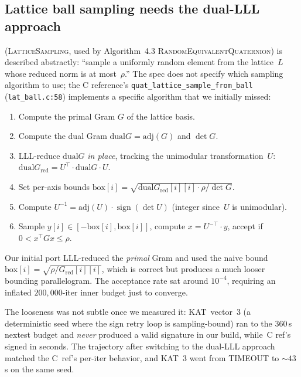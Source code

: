 \subsection{Lattice ball sampling needs the dual-LLL approach}
\label{sec:bug-sample-from-ball-dual-lll}

 (\textsc{LatticeSampling}, used by Algorithm~4.3
\textsc{RandomEquivalentQuaternion}) is described abstractly: ``sample
a uniformly random element from the lattice~$L$ whose reduced norm is
at most~$\rho$.'' The spec does not specify which sampling algorithm
to use; the C reference's
\texttt{quat\_lattice\_sample\_from\_ball} (\texttt{lat\_ball.c:58})
implements a specific algorithm that we initially missed:
\begin{enumerate}[nosep]
  \item Compute the primal Gram $G$ of the lattice basis.
  \item Compute the dual Gram $\mathrm{dual}G = \mathrm{adj}(G)$
        and $\det G$.
  \item LLL-reduce $\mathrm{dual}G$ \emph{in place}, tracking the
        unimodular transformation~$U$:
        $\mathrm{dual}G_{\mathrm{red}} = U^\top \cdot \mathrm{dual}G
        \cdot U$.
  \item Set per-axis bounds
        $\mathrm{box}[i] = \sqrt{\mathrm{dual}G_{\mathrm{red}}[i][i]
        \cdot \rho / \det G}$.
  \item Compute $U^{-1} = \mathrm{adj}(U) \cdot \operatorname{sign}(\det U)$
        (integer since~$U$ is unimodular).
  \item Sample $y[i] \in [-\mathrm{box}[i], \mathrm{box}[i]]$,
        compute $x = U^{-\top} \cdot y$, accept if
        $0 < x^\top G x \le \rho$.
\end{enumerate}
Our initial port LLL-reduced the \emph{primal} Gram and used the
naive bound $\mathrm{box}[i] = \sqrt{\rho / G_{\mathrm{red}}[i][i]}$,
which is correct but produces a much looser bounding parallelogram.
The acceptance rate sat around $10^{-4}$, requiring an inflated
$200{,}000$-iter inner budget just to converge.

The looseness was not subtle once we measured it: KAT~vector~3 (a
deterministic seed where the sign retry loop is sampling-bound) ran
to the 360\,s nextest budget and \emph{never} produced a valid
signature in our build, while~C ref's signed in seconds.  The
trajectory after switching to the dual-LLL approach matched the
C~ref's per-iter behavior, and KAT~3 went from \textsc{TIMEOUT} to
$\sim 43$\,s on the same seed.

